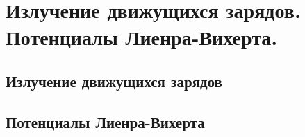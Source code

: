 \chapter{Излучение движущихся зарядов. Потенциалы Лиенра-Вихерта.}

\section{Излучение движущихся зарядов}
\section{Потенциалы Лиенра-Вихерта}

